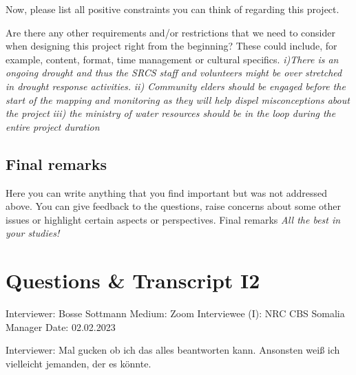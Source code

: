 Now, please list all positive constraints you can think of regarding this project.

Are there any other requirements and/or restrictions that we need to consider when designing this project right from the beginning? These could include, for example, content, format, time management or cultural specifics.\newline
\textit{i)There is an ongoing drought and thus the SRCS staff and volunteers might be over stretched in drought response activities.}\newline
\textit{ii) Community elders should be engaged before the start of the mapping and monitoring as they will help dispel misconceptions about the project}\newline
\textit{iii) the ministry of water resources should be in the loop during the entire project duration}

\subsection*{Final remarks}
Here you can write anything that you find important but was not addressed above. You can give feedback to the questions, raise concerns about some other issues or highlight certain aspects or perspectives.\newline
Final remarks \newline
\textit{All the best in your studies!}


\section{Questions \& Transcript I2}
Interviewer: Bosse Sottmann\newline
Medium: Zoom\newline
Interviewee (I): NRC CBS Somalia Manager \newline
Date: 02.02.2023

Interviewer: Mal gucken ob ich das alles beantworten kann. Ansonsten weiß ich vielleicht jemanden, der es k{\"o}nnte.

